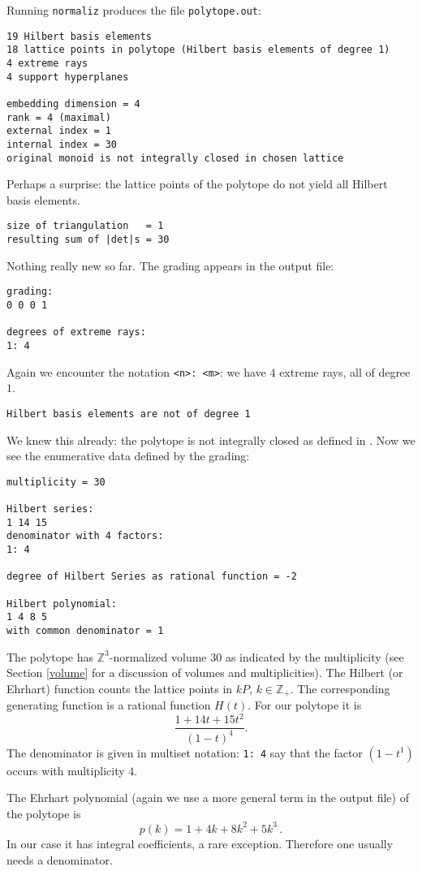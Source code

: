 \documentclass[12pt,a4paper]{scrartcl}
\theoremstyle{definition}
\def\ZZ{{\mathbb Z}}
\def\ttt{\texttt}
\begin{document}
Running \ttt{normaliz} produces the file \ttt{polytope.out}:
\begin{Verbatim}
19 Hilbert basis elements
18 lattice points in polytope (Hilbert basis elements of degree 1)
4 extreme rays
4 support hyperplanes

embedding dimension = 4
rank = 4 (maximal)
external index = 1
internal index = 30
original monoid is not integrally closed in chosen lattice
\end{Verbatim}
Perhaps a surprise: the lattice points of the polytope do not yield all Hilbert basis elements. 
\begin{Verbatim}
size of triangulation   = 1
resulting sum of |det|s = 30
\end{Verbatim}
Nothing really new so far. The grading appears in the output file:
\begin{Verbatim}
grading:
0 0 0 1 

degrees of extreme rays:
1: 4
\end{Verbatim}
Again we encounter the notation \verb|<n>: <m>|: we have $4$ extreme rays, all of degree $1$.
\begin{Verbatim}
Hilbert basis elements are not of degree 1
\end{Verbatim}
We knew this already: the polytope is not integrally closed as defined in \cite{BG}. Now we see the enumerative data defined by the grading:
\begin{Verbatim}
multiplicity = 30

Hilbert series:
1 14 15 
denominator with 4 factors:
1: 4  

degree of Hilbert Series as rational function = -2

Hilbert polynomial:
1 4 8 5 
with common denominator = 1
\end{Verbatim}
The polytope has $\ZZ^3$-normalized volume $30$ as indicated by the multiplicity (see Section \ref{volume} for a discussion of volumes and multiplicities). The Hilbert (or Ehrhart) function counts the lattice points in $kP$, $k\in\ZZ_+$. The corresponding generating function is a
rational function $H(t)$. For our polytope it is
$$
\frac{1+14t+15t^2}{(1-t)^4}.
$$
The denominator is given in multiset notation: \verb|1: 4| say that the factor $(1-t^1)$ occurs with multiplicity $4$.

The Ehrhart polynomial (again we use a more general term in
the output file) of the polytope is
$$
p(k)=1+4k+8k^2+5k^3\,.
$$
In our case it has integral coefficients, a rare exception. Therefore one usually needs a denominator.
\end{document}
